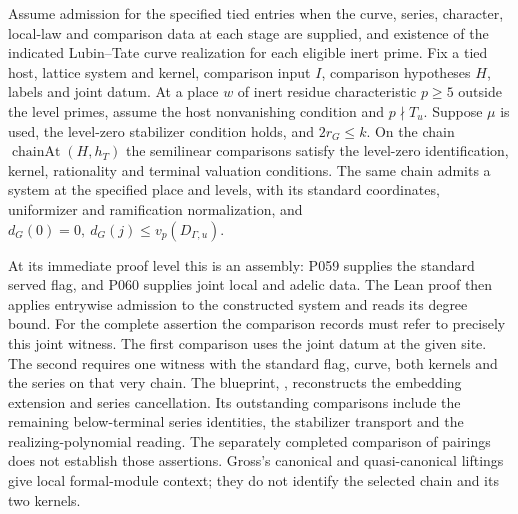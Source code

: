 
\begin{formalstatement}\label{pn:P046}
Assume admission for the specified tied entries when the curve, series, character, local-law and comparison data at each stage are supplied, and existence of the indicated Lubin--Tate curve realization for each eligible inert prime. Fix a tied host, lattice system and kernel, comparison input \(I\), comparison hypotheses \(H\), labels and joint datum. At a place \(w\) of inert residue characteristic \(p\ge5\) outside the level primes, assume the host nonvanishing condition and \(p\nmid T_u\). Suppose \(\mu\) is used, the level-zero stabilizer condition holds, and \(2r_G\le k\). On the chain \(\operatorname{chainAt}(H,h_T)\) the semilinear comparisons satisfy the level-zero identification, kernel, rationality and terminal valuation conditions. The same chain admits a system at the specified place and levels, with its standard coordinates, uniformizer and ramification normalization, and \(d_G(0)=0,\ d_G(j)\le v_p(D_{\Gamma,u})\).
\end{formalstatement}
At its immediate proof level this is an assembly: P059 supplies the standard served flag, and P060 supplies joint local and adelic data. The Lean proof then applies entrywise admission to the constructed system and reads its degree bound. For the complete assertion the comparison records must refer to precisely this joint witness.
The first comparison uses the joint datum at the given site. The second requires one witness with the standard flag, curve, both kernels and the series on that very chain. The blueprint, , reconstructs the embedding extension and series cancellation. Its outstanding comparisons include the remaining below-terminal series identities, the stabilizer transport and the realizing-polynomial reading. The separately completed comparison of pairings does not establish those assertions. Gross's canonical and quasi-canonical liftings give local formal-module context; they do not identify the selected chain and its two kernels.
